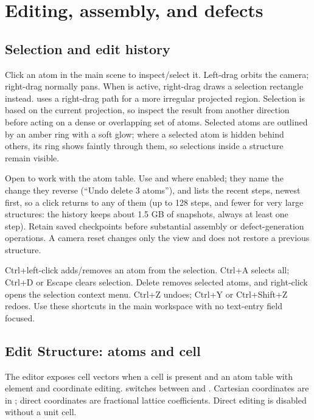 \chapter{Editing, assembly, and defects}\label{ch:editing}
\section{Selection and edit history}
Click an atom in the main scene to inspect/select it. Left-drag orbits the camera; right-drag normally pans. When  is active, right-drag draws a selection rectangle instead.  uses a right-drag path for a more irregular projected region. Selection is based on the current projection, so inspect the result from another direction before acting on a dense or overlapping set of atoms. Selected atoms are outlined by an amber ring with a soft glow; where a selected atom is hidden behind others, its ring shows faintly through them, so selections inside a structure remain visible.

Open  to work with the atom table. Use  and  where enabled; they name the change they reverse (``Undo delete 3 atoms''), and  lists the recent steps, newest first, so a click returns to any of them (up to 128 steps, and fewer for very large structures: the history keeps about 1.5 GB of snapshots, always at least one step). Retain saved checkpoints before substantial assembly or defect-generation operations. A camera reset changes only the view and does not restore a previous structure.

Ctrl+left-click adds/removes an atom from the selection. Ctrl+A selects all; Ctrl+D or Escape clears selection. Delete removes selected atoms, and right-click opens the selection context menu. Ctrl+Z undoes; Ctrl+Y or Ctrl+Shift+Z redoes. Use these shortcuts in the main workspace with no text-entry field focused.

\section{Edit Structure: atoms and cell}
The editor exposes cell vectors when a cell is present and an atom table with element and coordinate editing.  switches between  and . Cartesian coordinates are in \angstrom; direct coordinates are fractional lattice coefficients. Direct editing is disabled without a unit cell.

